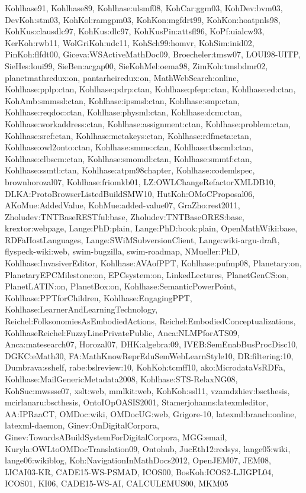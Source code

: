 {Kohlhase91,%
Kohlhase89,%
Kohlhase:ulsmf08,%
KohCar:ggm03,%
KohDev:bvm03,%
DevKoh:stm03,%
KohKol:ramgpm03,%
KohKon:mgfdrt99,%
KohKon:hoatpnls98,%
KohKus:clausdlc97,%
KohKus:dlc97,%
KohKusPin:attsfl96,%
KoPf:uialcw93,%
KerKoh:rwb11,%
WolGriKoh:udc11,%
KohSch99:homvr,%
KohSim:inid02,%
PinKoh:flfdt00,%
Giceva:WSActiveMathDoc09,%
Broecheler:tmsw07,%
LOUI98-UITP,%
SieHes:loui99,%
SieBen:acgap00,%
SieKohMel:oema98,%
ZimKoh:tmsbdmr02,%
planetmathredux:on,%
pantarheiredux:on,%
MathWebSearch:online,%
Kohlhase:pplp:ctan,%
Kohlhase:pdrp:ctan,%
Kohlhase:pfepr:ctan,%
Kohlhase:ed:ctan,%
KohAmb:smmssl:ctan,%
Kohlhase:ipsmsl:ctan,%
Kohlhase:smp:ctan,%
Kohlhase:reqdoc:ctan,%
Kohlhase:physml:ctan,%
Kohlhase:dcm:ctan,%
Kohlhase:workaddress:ctan,%
Kohlhase:assignment:ctan,%
Kohlhase:problem:ctan,%
Kohlhase:sref:ctan,%
Kohlhase:metakeys:ctan,%
Kohlhase:rdfmeta:ctan,%
Kohlhase:owl2onto:ctan,%
Kohlhase:smms:ctan,%
Kohlhase:tbscml:ctan,%
Kohlhase:clbscm:ctan,%
Kohlhase:smomdl:ctan,%
Kohlhase:smmtf:ctan,%
Kohlhase:ssmtl:ctan,%
Kohlhase:atpm98chapter,%
Kohlhase:codemlspec,%
brownhorozal07,%
Kohlhase:friomkb01,%
LZ:OWLChangeRefactorXMLDB10,%
DLKA:ProtoBrowserListedBuildSMW10,%
HutKoh:OMoCProposal06,%
AKoMue:AddedValue,%
KohMue:added-value07,%
GraZho:rest2011,%
Zholudev:TNTBaseRESTful:base,%
Zholudev:TNTBaseORES:base,%
krextor:webpage,%
Lange:PhD:plain,%
Lange:PhD:book:plain,%
OpenMathWiki:base,%
RDFaHostLanguages,%
Lange:SWiMSubversionClient,%
Lange:wiki-argu-draft,%
flyspeck-wiki:web,%
swim-bugzilla,%
swim-roadmap,%
NMueller:PhD,%
Kohlhase:InvasiverEditor,%
Kohlhase:AVAofPPT,%
Kohlhase:pufmp08,%
Planetary:on,%
PlanetaryEPCMilestone:on,%
EPCsystem:on,%
LinkedLectures,%
PlanetGenCS:on,%
PlanetLATIN:on,%
PlanetBox:on,%
Kohlhase:SemanticPowerPoint,%
Kohlhase:PPTforChildren,%
Kohlhase:EngagingPPT,%
Kohlhase:LearnerAndLearningTechnology,%
Reichel:FolksonomiesAsEmbodiedActions,%
Reichel:EmbodiedConceptualizations,%
KohlhaseReichel:FuzzyLinePrivatePublic,%
Anca:NLMPforATS09,%
Anca:matesearch07,%
Horozal07,%
DHK:algebra:09,%
IVEB:SemEnabBusProcDisc10,%
DGKC:eMath30,%
FA:MathKnowReprEduSemWebLearnStyle10,%
DR:filtering:10,%
Dumbrava:sshelf,%
rabe:bslreview:10,%
KohKoh:tcmff10,%
ako:MicrodataVsRDFa,%
Kohlhase:MailGenericMetadata2008,%
Kohlhase:STS-RelaxNG08,%
KohSuc:mwssse07,%
xslt:web,%
mmlkit:web,%
KohKoh:ssl11,%
vzamdzhiev:bscthesis,%
mcirlanaru:bscthesis,%
OntoIOpOASIS2001,%
Stamerjohanns:latexmleditor,%
AA:IPRaaCT,%
OMDoc:wiki,%
OMDocUG:web,%
Grigore-10,%
latexml:branch:online,%
latexml-daemon,%
Ginev:OnDigitalCorpora,%
Ginev:TowardsABuildSystemForDigitalCorpora,%
MGG:email,%
Kuryla:OWLtoOMDocTranslation09,%
Ontohub,%
JucEth12:redsys,%
lange05:wiki,%
lange06:wikiblog,%
Koh:NavigationInMathDocs2012,%
OpenJEM07,%
JEM08,%
IJCAI03-KR,%
CADE15-WS-PSMAD,%
ICOS00,%
BosKoh:ICOS2-LJIGPL04,%
ICOS01,%
KI06,%
CADE15-WS-AI,%
CALCULEMUS00,%
MKM05%
}
